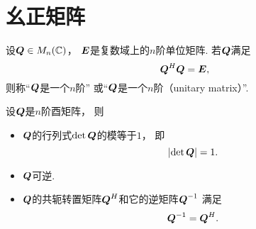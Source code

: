 \section{幺正矩阵}
\begin{definition}\label{definition:幺正矩阵.幺正矩阵的定义}
设\(\boldsymbol{Q} \in M_n(\mathbb{C})\)，
\(\boldsymbol{E}\)是复数域上的\(n\)阶单位矩阵.
若\(\boldsymbol{Q}\)满足\begin{equation}\label{equation:幺正矩阵.幺正矩阵的定义式}
	\boldsymbol{Q}^H \boldsymbol{Q} = \boldsymbol{E},
\end{equation}
则称“\(\boldsymbol{Q}\)是一个\(n\)阶”
或“\(\boldsymbol{Q}\)是一个\(n\)阶（unitary matrix）”.
\end{definition}

\begin{property}
设\(\boldsymbol{Q}\)是\(n\)阶酉矩阵，
则\begin{itemize}
	\item \(\boldsymbol{Q}\)的行列式\(\det\boldsymbol{Q}\)的模等于\(1\)，
	即\begin{equation}\label{equation:幺正矩阵.幺正矩阵的行列式}
		\abs{\det\boldsymbol{Q}}=1.
	\end{equation}

	\item \(\boldsymbol{Q}\)可逆.

	\item \(\boldsymbol{Q}\)的共轭转置矩阵\(\boldsymbol{Q}^H\)和它的逆矩阵\(\boldsymbol{Q}^{-1}\)
	满足\begin{equation}\label{equation:幺正矩阵.幺正矩阵的转置等于幺正矩阵的逆}
		\boldsymbol{Q}^{-1} = \boldsymbol{Q}^H.
	\end{equation}
\end{itemize}
\end{property}

